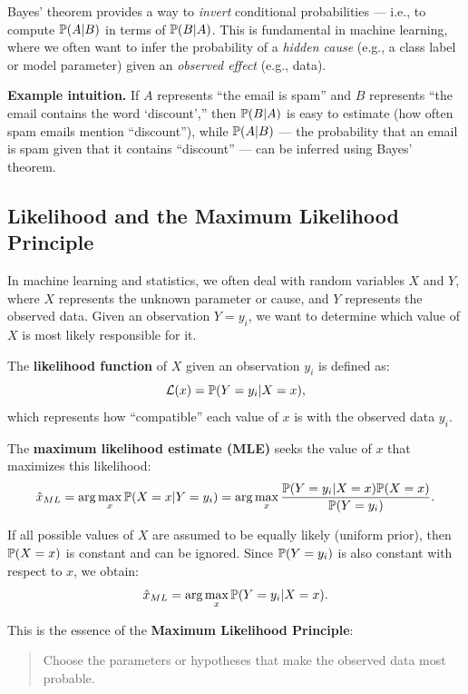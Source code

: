 \documentclass[10pt, letterpaper]{report}
\begin{document}
Bayes’ theorem provides a way to \textit{invert} conditional probabilities — i.e., to compute ${\mathbb P}(A|B)$ in terms of ${\mathbb P}(B|A)$.
This is fundamental in machine learning, where we often want to infer the probability of a \emph{hidden cause} (e.g., a class label or model parameter) given an \emph{observed effect} (e.g., data).

\bigskip
\textbf{Example intuition.}
If $A$ represents “the email is spam” and $B$ represents “the email contains the word ‘discount’,” then ${\mathbb P}(B|A)$ is easy to estimate (how often spam emails mention “discount”),
while ${\mathbb P}(A|B)$ — the probability that an email is spam given that it contains “discount” — can be inferred using Bayes’ theorem.

\bigskip
\subsection{Likelihood and the Maximum Likelihood Principle}

In machine learning and statistics, we often deal with random variables $X$ and $Y$, where $X$ represents the unknown parameter or cause, and $Y$ represents the observed data.
Given an observation $Y = y_i$, we want to determine which value of $X$ is most likely responsible for it.

\bigskip
The \textbf{likelihood function} of $X$ given an observation $y_i$ is defined as:
\begin{equation}
	\mathcal{L}(x) = {\mathbb P}(Y = y_i | X = x),
\end{equation}
which represents how “compatible” each value of $x$ is with the observed data $y_i$.

\bigskip
The \textbf{maximum likelihood estimate (MLE)} seeks the value of $x$ that maximizes this likelihood:
\begin{equation}
	\hat{x}_{ML} = \arg\max_x {\mathbb P}(X = x | Y = y_i) = \arg\max_x \frac{{\mathbb P}(Y = y_i | X = x){\mathbb P}(X = x)}{{\mathbb P}(Y = y_i)}.
\end{equation}

If all possible values of $X$ are assumed to be equally likely (uniform prior), then ${\mathbb P}(X=x)$ is constant and can be ignored.
Since ${\mathbb P}(Y=y_i)$ is also constant with respect to $x$, we obtain:
\begin{equation}
	\hat{x}_{ML} = \arg\max_x {\mathbb P}(Y = y_i | X = x).
\end{equation}

\noindent
This is the essence of the \textbf{Maximum Likelihood Principle}:
\begin{quote}
	Choose the parameters or hypotheses that make the observed data most probable.
\end{quote}
\end{document}
